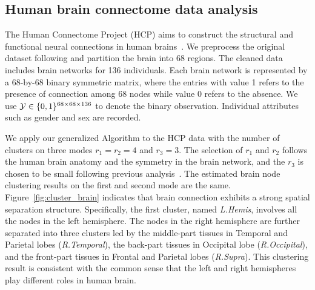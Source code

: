 \documentclass[lettersize,journal]{IEEEtran}
\theoremstyle{definition}
\theoremstyle{definition}
\begin{document}
\subsection{Human brain connectome data analysis}

The Human Connectome Project (HCP) aims to construct the structural and functional neural connections in human brains~\citep{van2013wu}. We preprocess the original dataset following \cite{desikan2006automated} and partition the brain into 68 regions. The cleaned data includes brain networks for 136 individuals. Each brain network is represented by a 68-by-68 binary symmetric matrix, where the entries with value 1 refers to the presence of connection among 68 nodes while value 0 refers to the absence. We use $\mathcal{Y} \in \{0,1\}^{68 \times 68 \times 136}$ to denote the binary observation. Individual attributes such as gender and sex are recorded.

We apply our generalized Algorithm to the HCP data with the number of clusters on three modes $r_1 = r_2 = 4$ and $r_3 = 3$. The selection of $r_1$ and $r_2$ follows the human brain anatomy and the symmetry in the brain network, and the $r_3$ is chosen to be small following previous analysis~\citep{hu2021generalized}. The estimated brain node clustering results on the first and second mode are the same. Figure~\ref{fig:cluster_brain} indicates that brain connection exhibits a strong spatial separation structure. Specifically, the first cluster, named \emph{L.Hemis}, involves all the nodes in the left hemisphere. The nodes in the right hemisphere are further separated into three clusters led by the middle-part tissues in Temporal and Parietal lobes (\emph{R.Temporal}), the back-part tissues in Occipital lobe (\emph{R.Occipital}), and the front-part tissues in Frontal and Parietal lobes (\emph{R.Supra}). This clustering result is consistent with the common sense that the left and right hemispheres play different roles in human brain. 

\end{document}
